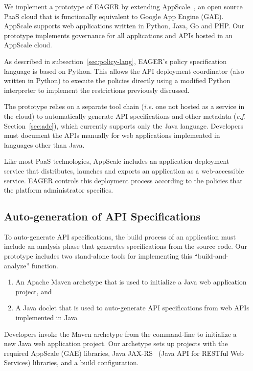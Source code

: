 We implement a prototype of EAGER by extending AppScale~\cite{appscale13}, 
an open source PaaS cloud that is 
functionally equivalent to Google App Engine (GAE).  AppScale supports
web applications written in Python, Java, Go and PHP. Our prototype
implements governance for all applications and APIs hosted in an AppScale cloud. 

As described in subsection~\ref{sec:policy-lang}, 
EAGER's policy specification language is based on Python.
This allows the API deployment coordinator (also written in Python) to
execute the policies directly using a modified Python interpreter to implement the
restrictions previously discussed.


The prototype relies on a separate tool chain ({\em i.e.} one not hosted as a
service in the cloud) to automatically generate
API specifications and other metadata ({\em c.f.} Section~\ref{sec:adc}), which
currently supports only the Java language.  
Developers must document the APIs manually
for web applications implemented in languages other than Java.

Like most PaaS technologies, AppScale includes an application deployment
service that distributes, launches and exports an application
as a web-accessible service.  EAGER controls this deployment
process according to the policies that the platform administrator specifies.

\subsection{Auto-generation of API Specifications}
To auto-generate API specifications, the build process of an application must
include an analysis phase that generates specifications from the source code.
Our prototype includes two stand-alone tools for implementing this
``build-and-analyze'' function.
\begin{enumerate}
\item An Apache Maven archetype that is used to initialize a Java
web application project, and 
\item A Java doclet that is used to auto-generate API specifications from web APIs implemented in Java
\end{enumerate}

Developers invoke the Maven archetype from the command-line to initialize
a new Java web application project. Our archetype sets up projects with the
required AppScale (GAE) libraries, Java JAX-RS~\cite{jaxrs} (Java API for RESTful Web
Services) libraries, and a build configuration.

